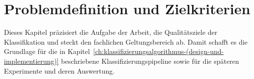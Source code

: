 \chapter{Problemdefinition und Zielkriterien}\label{ch:problemdefinition-und-zielkriterien}

Dieses Kapitel präzisiert die Aufgabe der Arbeit, die Qualitätsziele der Klassifikation und steckt den fachlichen Geltungsbereich ab. Damit schafft es die Grundlage für die in Kapitel~\ref{ch:klassifizierungsalgorithmus-(design-und-implementierung)} beschriebene Klassifizierungspipeline sowie für die späteren Experimente und deren Auswertung.




